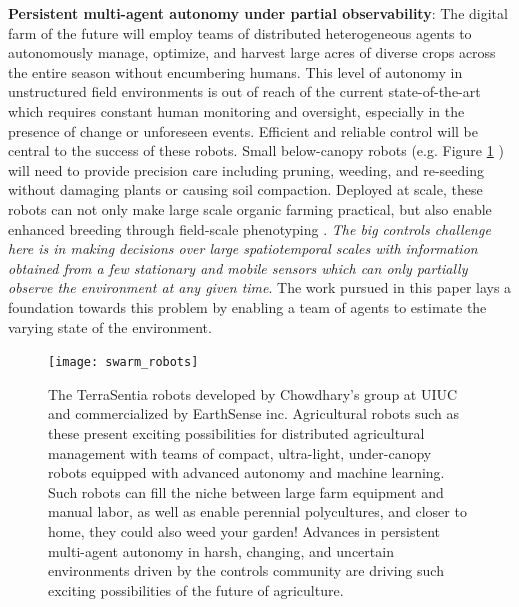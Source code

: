 \textbf{Persistent multi-agent autonomy under partial observability}:  The digital farm of the future will employ teams of distributed heterogeneous agents to autonomously manage, optimize, and harvest large acres of diverse crops across the entire season without encumbering humans. This level of autonomy in unstructured field environments is out of reach of the current state-of-the-art which requires constant human monitoring and oversight, especially in the presence of change or unforeseen events. Efficient and reliable control will be central to the success of these robots. Small below-canopy robots (e.g. Figure \ref{fig:terrasentia} \cite{kayacan2018embedded}) will need to provide precision care including pruning, weeding, and re-seeding without damaging plants or causing soil compaction. Deployed at scale, these robots can not only make large scale organic farming practical, but also enable enhanced breeding through  field-scale phenotyping \cite{kayacan2018embedded,mueller2017robotanist,virlet2017field}. \textit{The big controls challenge here is in making decisions over large spatiotemporal scales with information obtained from a few stationary and mobile sensors which can only partially observe the environment at any given time}. The work pursued in this paper lays a foundation towards this problem by enabling a team of agents to estimate the varying state of the environment. %

\begin{figure}
\texttt{[image: swarm\_robots]}
\caption{The TerraSentia robots developed by Chowdhary's group at UIUC and commercialized by EarthSense inc. Agricultural robots such as these present exciting possibilities for distributed agricultural management with teams of compact, ultra-light, under-canopy robots equipped with advanced autonomy and machine learning. Such robots can fill the niche between large farm equipment and manual labor, as well as enable perennial polycultures, and closer to home,  they could also weed your garden! Advances in persistent multi-agent autonomy in harsh, changing, and uncertain environments driven by the controls community are driving such exciting possibilities of the future of agriculture.}
\label{fig:terrasentia}
\end{figure}


